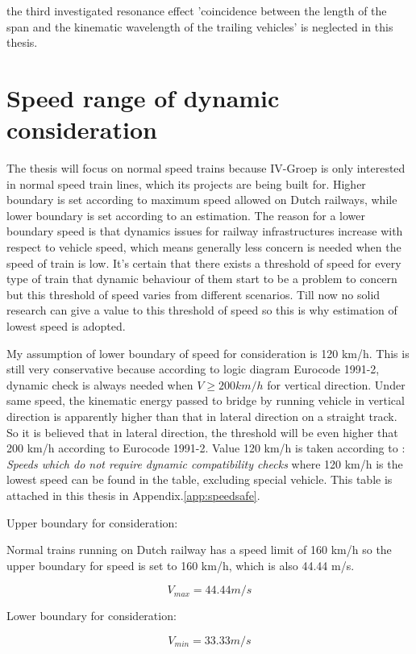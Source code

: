 the third investigated resonance effect 'coincidence between the length of the span and the kinematic wavelength of the trailing vehicles' is neglected in this thesis. 


\section{Speed range of dynamic consideration}

The thesis will focus on normal speed trains because IV-Groep is only interested in normal speed train lines, which its projects are being built for. Higher boundary is set according to maximum speed allowed on Dutch railways, while lower boundary is set according to an estimation. The reason for a lower boundary speed is that dynamics issues for railway infrastructures increase with respect to vehicle speed, which means generally less concern is needed when the speed of train is low. It's certain that there exists a threshold of speed for every type of train that dynamic behaviour of them start to be a problem to concern but this threshold of speed varies from different scenarios. Till now no solid research can give a value to this threshold of speed so this is why estimation of lowest speed is adopted. 

My assumption of lower boundary of speed for consideration is 120 km/h. This is still very conservative because according to logic diagram Eurocode 1991-2\cite{EC12}, dynamic check is always needed when $V \geq 200km/h$ for vertical direction. Under same speed, the kinematic energy passed to bridge by running vehicle in vertical direction is apparently higher than that in lateral direction on a straight track. So it is believed that in lateral direction, the threshold will be even higher that 200 km/h according to Eurocode 1991-2. Value 120 km/h is taken according to \cite[Appendix F]{EC15528}: \textit{Speeds which do not require dynamic compatibility checks} where 120 km/h is the lowest speed can be found in the table, excluding special vehicle. This table is attached in this thesis in Appendix.\ref{app:speedsafe}.

Upper boundary for consideration:

Normal trains running on Dutch railway has a speed limit of 160 km/h so the upper boundary for speed is set to 160 km/h, which is also 44.44 m/s. 

$$ V_{max} = 44.44m/s $$

Lower boundary for consideration:

$$ V_{min} = 33.33m/s $$

